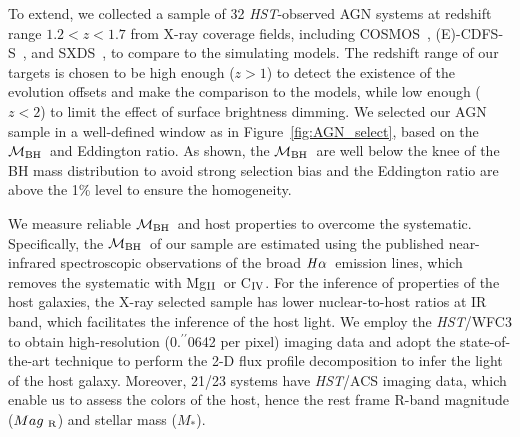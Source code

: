 \documentclass{natureprintstyle}
\newcommand{\hst}{{\it HST}}
\newcommand{\mbh}{$\mathcal M_{\rm BH}$}
\newcommand{\mr}{$Mag_{\rm ~R}$}
\newcommand{\halpha}{${\it H}\alpha$}
\newcommand{\mstar}{{$M_*$}}
\newcommand{\Mgii}{Mg$_{\rm II}$}
\newcommand{\Civ}{C$_{\rm IV}$}
\newcommand{\farcs}{\mbox{\ensuremath{.\!\!^{\prime\prime}}}}%
\begin{document}

To extend, we collected a sample of 32 \hst-observed AGN systems at redshift range $1.2<z<1.7$ from X-ray coverage fields, including COSMOS~\cite{Civano2016}, (E)-CDFS-S~\cite{Lehmer2005, Xue2011}, and SXDS~\cite{Ueda2008}, to compare to the simulating models. The redshift range of our targets is chosen to be high enough ($z>1$) to detect the existence of the evolution offsets and make the comparison to the models, while low enough ($z<2$) to limit the effect of surface brightness dimming. We selected our AGN sample in a well-defined window as in Figure~\ref{fig:AGN_select}, based on the \mbh\ and Eddington ratio. As shown, the \mbh\ are well below the knee of the BH mass distribution to avoid strong selection bias and the Eddington ratio are above the 1\% level to ensure the homogeneity.

We measure reliable \mbh\ and host properties to overcome the systematic. Specifically, the \mbh\ of our sample are estimated using the published near-infrared spectroscopic observations of the broad \halpha\ emission lines, which removes the systematic with \Mgii\ or \Civ. For the inference of properties of the host galaxies, the X-ray selected sample has lower nuclear-to-host ratios at IR band, which facilitates the inference of the host light. We employ the \hst/WFC3 to obtain high-resolution (0\farcs0642 per pixel) imaging data and adopt the state-of-the-art technique to perform the 2-D flux profile decomposition to infer the light of the host galaxy. Moreover, 21/23 systems have \hst/ACS imaging data, which enable us to assess the colors of the host, hence the rest frame R-band magnitude (\mr) and stellar mass (\mstar). 
\end{document}
